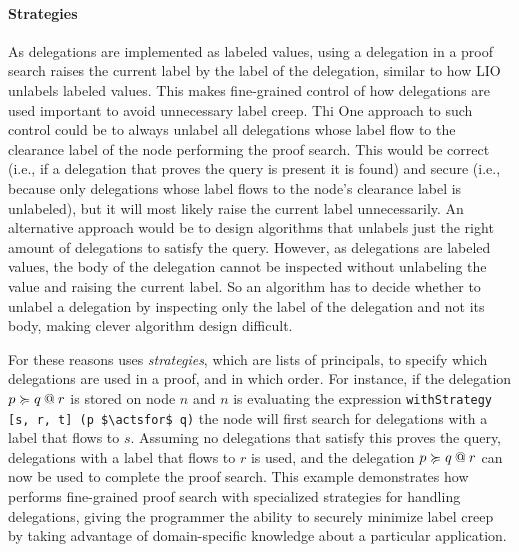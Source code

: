 \paragraph{Strategies}
As delegations are implemented as labeled values, using a delegation in a proof search raises the current label by the label of the delegation, similar to how LIO unlabels labeled values. This makes fine-grained control of how delegations are used important to avoid unnecessary label creep. Thi
One approach to such control could be to always unlabel all delegations whose label flow to the clearance label of the node performing the proof search. This would be correct (i.e., if a delegation that proves the query is present it is found) and secure (i.e., because only delegations whose label flows to the node's clearance label is unlabeled), but it will most likely raise the current label unnecessarily.
An alternative approach would be to design algorithms that unlabels just the right amount of delegations to satisfy the query. However, as delegations are labeled values, the body of the delegation cannot be inspected without unlabeling the value and raising the current label. So an algorithm has to decide whether to unlabel a delegation by inspecting only the label of the delegation and not its body, making clever algorithm design difficult.

For these reasons \lang{} uses \emph{strategies}, which are lists of principals, to specify which delegations are used in a proof, and in which order. For instance, if the delegation $\lb{r}{p \actsfor q}$ is stored on node $n$ and $n$ is evaluating the expression \lstinline[mathescape]!withStrategy [s, r, t] (p $\actsfor$ q)! the node will first search for delegations with a label that flows to $s$. Assuming no delegations that satisfy this proves the query, delegations with a label that flows to $r$ is used, and the delegation $\lb{r}{p \actsfor q}$ can now be used to complete the proof search. This example demonstrates how \lang{} performs fine-grained proof search with specialized strategies for handling delegations, giving the programmer the ability to securely minimize label creep by taking advantage of domain-specific knowledge about a particular application.

